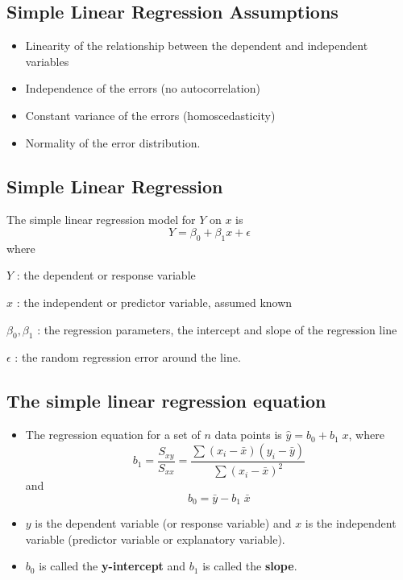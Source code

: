 \documentclass[
]{article}
\providecommand{\tightlist}{%
  \setlength{\itemsep}{0pt}\setlength{\parskip}{0pt}}
\begin{document}
\hypertarget{simple-linear-regression-assumptions-1}{%
\subsection{Simple Linear Regression
Assumptions}\label{simple-linear-regression-assumptions-1}}

\begin{itemize}
\item
  Linearity of the relationship between the dependent and independent
  variables
\item
  Independence of the errors (no autocorrelation)
\item
  Constant variance of the errors (homoscedasticity)
\item
  Normality of the error distribution.
\end{itemize}

\hypertarget{simple-linear-regression-2}{%
\subsection{Simple Linear Regression}\label{simple-linear-regression-2}}

The simple linear regression model for \(Y\) on \(x\) is
\[Y=\beta_0+\beta_1 x+\epsilon\] where

\(Y\) : the dependent or response variable

\(x\) : the independent or predictor variable, assumed known

\(\beta_0,\beta_1\) : the regression parameters, the intercept and slope
of the regression line

\(\epsilon\) : the random regression error around the line.

\hypertarget{the-simple-linear-regression-equation}{%
\subsection{The simple linear regression
equation}\label{the-simple-linear-regression-equation}}

\begin{itemize}
\tightlist
\item
  The regression equation for a set of \(n\) data points is
  \(\hat{y}=b_0+b_1\;x\), where
  \[b_1=\frac{S_{xy}}{S_{xx}}=\frac{\sum (x_i-\bar{x})(y_i-\bar{y})}{\sum (x_i-\bar{x})^2}\]
  and \[b_0=\bar{y}-b_1\; \bar{x}\]
\item
  \(y\) is the dependent variable (or response variable) and \(x\) is
  the independent variable (predictor variable or explanatory variable).
\item
  \(b_0\) is called the \textbf{y-intercept} and \(b_1\) is called the
  \textbf{slope}.
\end{itemize}
\end{document}
